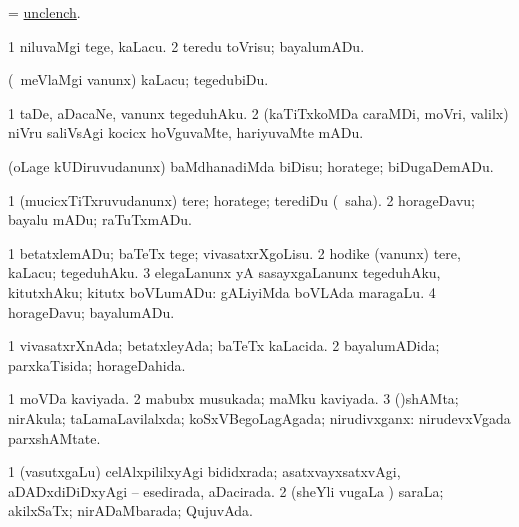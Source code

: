 \bentry
{} 
\gl{\kirx}
\expl{}
\bmng
= \hyperlink{unclench}{unclench}. 
\emng
\eentry

\bentry
{} 
\gl{\sakirx}
\expl{}
\bmng
\bnum
\num{1} niluvaMgi tege, kaLacu. 
\num{2} teredu toVrisu; bayalumADu. 
\enum
\emng

\noindent 
\gl{\akirx}
\bmng
(\sA\ meVlaMgi \mo vanunx) kaLacu; tegedubiDu. 
\emng
\eentry

\bentry
{} 
\gl{\sakirx}
\bmng
\bnum
\num{1} taDe, aDacaNe, \mo vanunx tegeduhAku. 
\num{2} (kaTiTxkoMDa caraMDi, moVri, \mo valilx) niVru saliVsAgi kocicx hoVguvaMte, hariyuvaMte mADu. 
\enum
\emng
\eentry

\bentry
{} 
\gl{\sakirx}
\expl{}
\bmng
(oLage kUDiruvudanunx) baMdhanadiMda biDisu; horatege; biDugaDemADu. 
\emng
\eentry

\bentry
{} 
\gl{\sakirx}
\expl{}
\bmng
\bnum
\num{1} (mucicxTiTxruvudanunx) tere; horatege; terediDu (\akirx\ saha). 
\num{2} horageDavu; bayalu mADu; raTuTxmADu. 
\enum
\emng
\eentry

\bentry
{} 
\gl{\sakirx}
\expl{}
\bmng
\bnum
\num{1} betatxlemADu; baTeTx tege; vivasatxrXgoLisu. 
\num{2} hodike (\mo vanunx) tere, kaLacu; tegeduhAku. 
\num{3} elegaLanunx yA sasayxgaLanunx tegeduhAku, kitutxhAku; kitutx boVLumADu:  gALiyiMda boVLAda maragaLu. 
\num{4} horageDavu; bayalumADu. 
\enum
\emng
\eentry

\bentry
{} 
\gl{\gu}
\expl{}
\bmng
\bnum
\num{1} vivasatxrXnAda; betatxleyAda; baTeTx kaLacida. 
\num{2} bayalumADida; parxkaTisida; horageDahida. 
\enum
\emng
\eentry

\bentry
{} 
\gl{\gu}
\expl{}
\bmng
\bnum
\num{1} moVDa kaviyada. 
\num{2} mabubx musukada; maMku kaviyada. 
\num{3} (\parx)shAMta; nirAkula; taLamaLavilalxda; koSxVBegoLagAgada; nirudivxganx:  nirudevxVgada parxshAMtate. 
\enum
\emng
\eentry

\bentry
{} 
\gl{\gu}
\expl{}
\bmng
\bnum
\num{1} (vasutxgaLu) celAlxpililxyAgi bididxrada; asatxvayxsatxvAgi, aDADxdiDiDxyAgi -- esedirada, aDacirada. 
\num{2} (sheYli \mo vugaLa \vi) saraLa; akilxSaTx; nirADaMbarada; QujuvAda. 
\enum
\emng
\eentry

